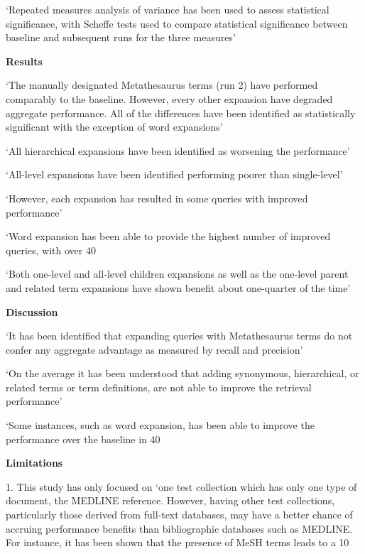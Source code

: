 \documentclass[]{article}
\begin{document}
{{‘Repeated measures analysis of variance has been used to assess statistical significance, with Scheffe tests used to compare statistical significance between baseline and subsequent runs for the three measures’

\textbf{Results}

‘The manually designated Metathesaurus terms (run 2) have performed comparably to the baseline. However, every other expansion have degraded aggregate performance. All of the differences have been identified as statistically significant with the exception of word expansions’

‘All hierarchical expansions have been identified as worsening the performance’

‘All-level expansions have been identified performing poorer than single-level’

‘However, each expansion has resulted in some queries with improved performance’

‘Word expansion has been able to provide the highest number of improved queries, with over 40%

‘Both one-level and all-level children expansions as well as the one-level parent and related term expansions have shown benefit about one-quarter of the time’

\textbf{Discussion}

‘It has been identified that expanding queries with Metathesaurus terms do not confer any aggregate advantage as measured by recall and precision’

‘On the average it has been understood that adding synonymous, hierarchical, or related terms or term definitions, are not able to improve the retrieval performance’

‘Some instances, such as word expansion, has been able to improve the performance over the baseline in 40%

\textbf{Limitations}

1.	This study has only focused on ‘one test collection which has only one type of document, the MEDLINE reference. However, having other test collections, particularly those derived from full-text databases, may have a better chance of accruing performance benefits than bibliographic databases such as MEDLINE. For instance, it has been shown that the presence of MeSH terms leads to a 10%

}}
\end{document}

